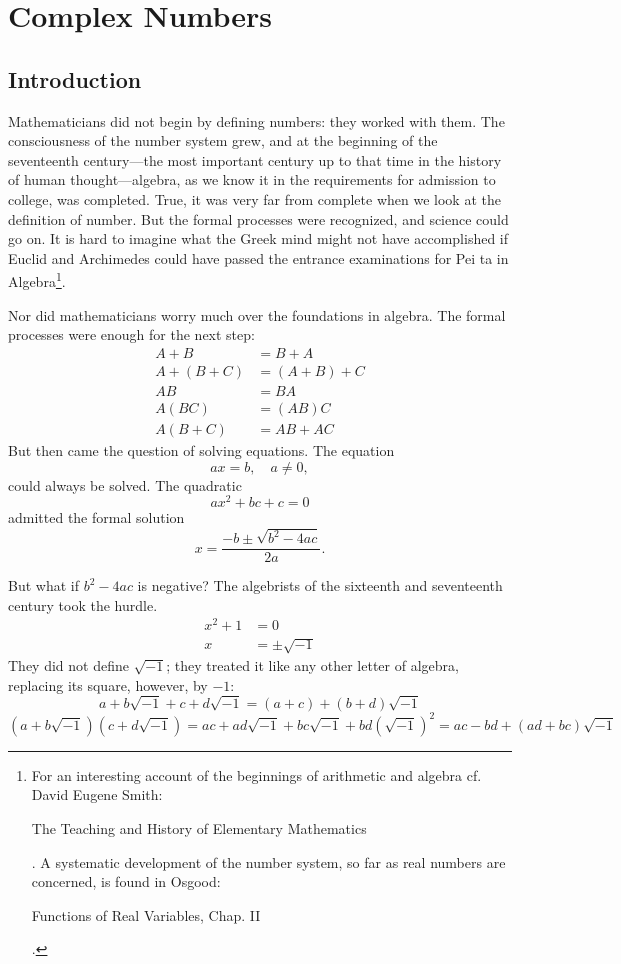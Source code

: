 \chapter{Complex Numbers}
\section{Introduction}

Mathematicians did not begin by defining numbers: they worked with them. The consciousness of the number system grew, and at the beginning of the seventeenth century---the most important century up to that time in the history of human thought---algebra, as we know it in the requirements for admission to college, was completed. True, it was very far from complete when we look at the definition of number. But the formal processes were recognized, and science could go on. It is hard to imagine what the Greek mind might not have accomplished if Euclid and Archimedes could have passed the entrance examinations for Pei ta in Algebra\footnote{For an interesting account of the beginnings of arithmetic and algebra cf. David Eugene Smith: \begin{emph}The Teaching and History of Elementary Mathematics\end{emph}. A systematic development of the number system, so far as real numbers are concerned, is found in Osgood: \begin{emph}Functions of Real Variables, Chap. II\end{emph}.}.

Nor did mathematicians worry much over the foundations in algebra. The formal processes were enough for the next step: 
\begin{align*}
	A+B&= B+A\\
	A+(B+C)&=(A+B)+C\\
	AB &= BA\\
	A(BC) &= (AB)C\\
	A(B+C) &= AB + AC
\end{align*} But then came the question of solving equations. The equation 
\[
ax=b, \quad a\neq 0
,\] could always be solved. The quadratic 
\[
ax^2+bc+c=0
\] admitted the formal solution 
\[
x=\frac{-b\pm \sqrt{b^2-4ac} }{2a} 
.\]

But what if $b^2-4ac$ is negative? The algebrists of the sixteenth and seventeenth century took the hurdle. 
\begin{align*}
	x^2+1&=0\\
	x&=\pm \sqrt{-1} 
\end{align*} They did not define $\sqrt{-1} $; they treated it like any other letter of algebra, replacing its square, however, by $-1$: 
\begin{equation}
	a+b\sqrt{-1} +c +d \sqrt{-1}= (a+c)+(b+d)\sqrt{-1}
\end{equation}
\begin{dmath}
	(a+b\sqrt{-1} )(c+d\sqrt{-1}) = ac+ad\sqrt{-1} +bc\sqrt{-1} +bd\left(\sqrt{-1}  \right) ^2=ac-bd+(ad+bc)\sqrt{-1}\label{1.2mult} 
\end{dmath} 

